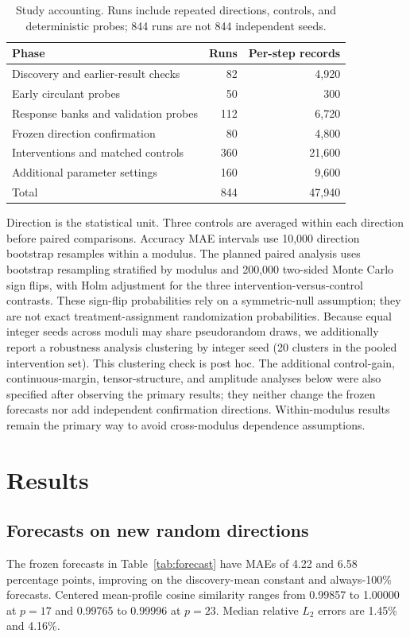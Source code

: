 \documentclass[11pt]{article}
\begin{document}
\begin{table}[t]
\centering
\caption{Study accounting. Runs include repeated directions, controls, and deterministic probes; 844 runs are not 844 independent seeds.}\label{tab:counts}
\begin{tabular}{lrr}
\toprule Phase & Runs & Per-step records\\\midrule
Discovery and earlier-result checks &82&4,920\\
Early circulant probes &50&300\\
Response banks and validation probes &112&6,720\\
Frozen direction confirmation &80&4,800\\
Interventions and matched controls &360&21,600\\
Additional parameter settings &160&9,600\\\midrule
Total&844&47,940\\\bottomrule
\end{tabular}
\end{table}

Direction is the statistical unit. Three controls are averaged within each direction before paired comparisons. Accuracy MAE intervals use 10,000 direction bootstrap resamples within a modulus. The planned paired analysis uses bootstrap resampling stratified by modulus and 200,000 two-sided Monte Carlo sign flips, with Holm adjustment for the three intervention-versus-control contrasts. These sign-flip probabilities rely on a symmetric-null assumption; they are not exact treatment-assignment randomization probabilities. Because equal integer seeds across moduli may share pseudorandom draws, we additionally report a robustness analysis clustering by integer seed (20 clusters in the pooled intervention set). This clustering check is post hoc. The additional control-gain, continuous-margin, tensor-structure, and amplitude analyses below were also specified after observing the primary results; they neither change the frozen forecasts nor add independent confirmation directions. Within-modulus results remain the primary way to avoid cross-modulus dependence assumptions.

\section{Results}\label{sec:results}
\subsection{Forecasts on new random directions}
The frozen forecasts in Table~\ref{tab:forecast} have MAEs of 4.22 and 6.58 percentage points, improving on the discovery-mean constant and always-100\% forecasts. Centered mean-profile cosine similarity ranges from 0.99857 to 1.00000 at $p=17$ and 0.99765 to 0.99996 at $p=23$. Median relative $L_2$ errors are 1.45\% and 4.16\%.
\end{document}
